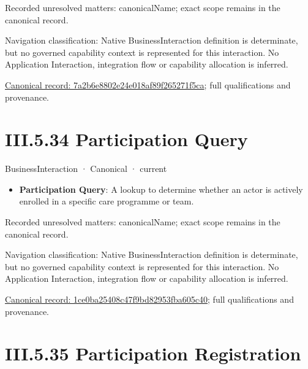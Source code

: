{\small Recorded unresolved matters: canonicalName; exact scope remains in the canonical record.}\par
{\small Navigation classification: Native BusinessInteraction definition is determinate, but no governed capability context is represented for this interaction. No Application Interaction, integration flow or capability allocation is inferred.}\par
{\footnotesize \href{../../../../../../../../continuum/business/business-interaction/7a2b6e8802e24e018af89f265271f5ca.md}{Canonical record: 7a2b6e8802e24e018af89f265271f5ca}; full qualifications and provenance.}\par
\section*{III.5.34 Participation Query}
\label{navigation:III.5.34}

\label{element:1ce0ba25408c47f9bd82953fba605c40}
{\small BusinessInteraction · Canonical · current}\par

\begin{itemize}


\item \textbf{Participation Query}: A lookup to determine whether an actor is actively enrolled in a specific care programme or team.

\end{itemize}

{\small Recorded unresolved matters: canonicalName; exact scope remains in the canonical record.}\par
{\small Navigation classification: Native BusinessInteraction definition is determinate, but no governed capability context is represented for this interaction. No Application Interaction, integration flow or capability allocation is inferred.}\par
{\footnotesize \href{../../../../../../../../continuum/business/business-interaction/1ce0ba25408c47f9bd82953fba605c40.md}{Canonical record: 1ce0ba25408c47f9bd82953fba605c40}; full qualifications and provenance.}\par
\section*{III.5.35 Participation Registration}
\label{navigation:III.5.35}

